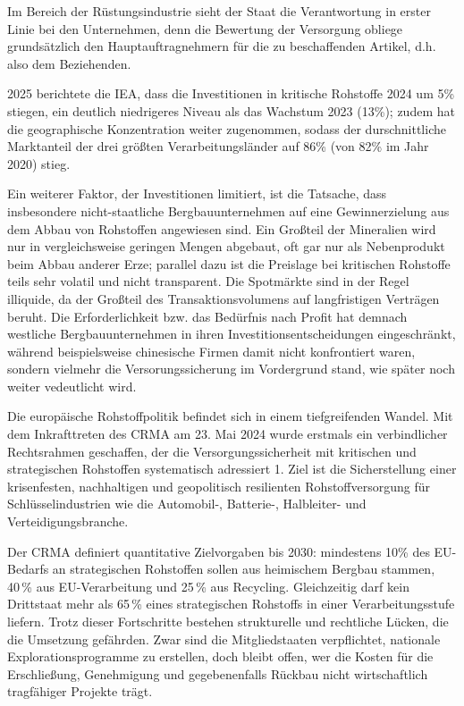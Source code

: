 \documentclass[12pt,a4paper,oneside]{book} %
\begin{document}
	Im Bereich der Rüstungsindustrie sieht der Staat die Verantwortung in erster Linie bei den Unternehmen, denn die Bewertung der Versorgung obliege \glqq grundsätzlich den Hauptauftragnehmern für die zu beschaffenden Artikel\grqq, d.h. also dem Beziehenden.\autocite{https://table.media/security/analyse/mangelware-sprengstoff-experten-warnen-vor-aussereuropaeischer-abhaengigkeit}
	
	2025 berichtete die IEA, dass die Investitionen in kritische Rohstoffe 2024 um 5\% stiegen, ein deutlich niedrigeres Niveau als das Wachstum 2023 (13\%); zudem hat die geographische Konzentration weiter zugenommen, sodass der durschnittliche Marktanteil der drei größten Verarbeitungsländer auf 86\% (von 82\% im Jahr 2020) stieg.\autocite{IEA Critical Minerals Outlook 2025, S. 68}
	
	Ein weiterer Faktor, der Investitionen limitiert, ist die Tatsache, dass insbesondere nicht-staatliche Bergbauunternehmen auf eine Gewinnerzielung aus dem Abbau von Rohstoffen angewiesen sind. Ein Großteil der Mineralien wird nur in vergleichsweise geringen Mengen abgebaut, oft gar nur als Nebenprodukt beim Abbau anderer Erze; parallel dazu ist die Preislage bei kritischen Rohstoffe teils sehr volatil und nicht transparent. Die Spotmärkte sind in der Regel illiquide, da der Großteil des Transaktionsvolumens auf langfristigen Verträgen beruht. Die Erforderlichkeit bzw. das Bedürfnis nach Profit hat demnach westliche Bergbauunternehmen in ihren Investitionsentscheidungen eingeschränkt, während beispielsweise chinesische Firmen damit nicht konfrontiert waren, sondern vielmehr die Versorungssicherung im Vordergrund stand, wie später noch weiter vedeutlicht wird.
	
	Die europäische Rohstoffpolitik befindet sich in einem tiefgreifenden Wandel. Mit dem Inkrafttreten des CRMA am 23. Mai 2024 wurde erstmals ein verbindlicher Rechtsrahmen geschaffen, der die Versorgungssicherheit mit kritischen und strategischen Rohstoffen systematisch adressiert 1. Ziel ist die Sicherstellung einer krisenfesten, nachhaltigen und geopolitisch resilienten Rohstoffversorgung für Schlüsselindustrien wie die Automobil-, Batterie-, Halbleiter- und Verteidigungsbranche.
	
	Der CRMA definiert quantitative Zielvorgaben bis 2030: mindestens 10\% des EU-Bedarfs an strategischen Rohstoffen sollen aus heimischem Bergbau stammen, 40 \% aus EU-Verarbeitung und 25 \% aus Recycling. Gleichzeitig darf kein Drittstaat mehr als 65 \% eines strategischen Rohstoffs in einer Verarbeitungsstufe liefern. Trotz dieser Fortschritte bestehen strukturelle und rechtliche Lücken, die die Umsetzung gefährden. Zwar sind die Mitgliedstaaten verpflichtet, nationale Explorationsprogramme zu erstellen, doch bleibt offen, wer die Kosten für die Erschließung, Genehmigung und gegebenenfalls Rückbau nicht wirtschaftlich tragfähiger Projekte trägt.
	
\end{document}
